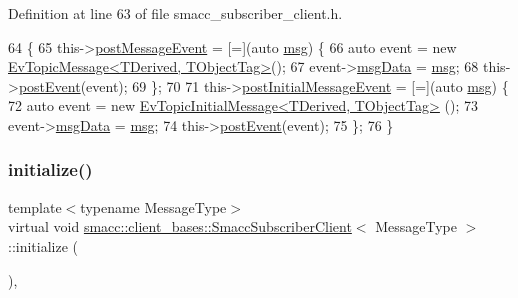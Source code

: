 Definition at line 63 of file smacc\+\_\+subscriber\+\_\+client.\+h.


\begin{DoxyCode}
64   \{
65     this->\hyperlink{classsmacc_1_1client__bases_1_1SmaccSubscriberClient_ad71ae0708e8a3ea321de985076d8b0ac}{postMessageEvent} = [=](\textcolor{keyword}{auto} \hyperlink{namespacebattery__monitor__node_ab1920c64448816edd4064e494275fdff}{msg}) \{
66       \textcolor{keyword}{auto} \textcolor{keyword}{event} = \textcolor{keyword}{new} \hyperlink{structsmacc_1_1default__events_1_1EvTopicMessage}{EvTopicMessage<TDerived, TObjectTag>}();
67       \textcolor{keyword}{event}->\hyperlink{structsmacc_1_1default__events_1_1EvTopicMessage_a82384568b702a0c3a3dc2fbe7eeefea9}{msgData} = \hyperlink{namespacebattery__monitor__node_ab1920c64448816edd4064e494275fdff}{msg};
68       this->\hyperlink{classsmacc_1_1ISmaccClient_a21a79203cb44fc717d4d977c190327c6}{postEvent}(event);
69     \};
70 
71     this->\hyperlink{classsmacc_1_1client__bases_1_1SmaccSubscriberClient_ac184f4c0a6e924ceb9eecc71d6252106}{postInitialMessageEvent} = [=](\textcolor{keyword}{auto} \hyperlink{namespacebattery__monitor__node_ab1920c64448816edd4064e494275fdff}{msg}) \{
72       \textcolor{keyword}{auto} \textcolor{keyword}{event} = \textcolor{keyword}{new} \hyperlink{structsmacc_1_1default__events_1_1EvTopicInitialMessage}{EvTopicInitialMessage<TDerived, TObjectTag>}
      ();
73       \textcolor{keyword}{event}->\hyperlink{structsmacc_1_1default__events_1_1EvTopicInitialMessage_a989c7cf4210c7750806b081bc73112cd}{msgData} = \hyperlink{namespacebattery__monitor__node_ab1920c64448816edd4064e494275fdff}{msg};
74       this->\hyperlink{classsmacc_1_1ISmaccClient_a21a79203cb44fc717d4d977c190327c6}{postEvent}(event);
75     \};
76   \}
\end{DoxyCode}
\mbox{\label{classsmacc_1_1client__bases_1_1SmaccSubscriberClient_af188f0f5e89de26a07e1f964cdd23a70}} 
\subsubsection{\texorpdfstring{initialize()}{initialize()}}
{\footnotesize\ttfamily template$<$typename Message\+Type$>$ \\
virtual void \hyperlink{classsmacc_1_1client__bases_1_1SmaccSubscriberClient}{smacc\+::client\+\_\+bases\+::\+Smacc\+Subscriber\+Client}$<$ Message\+Type $>$\+::initialize (\begin{DoxyParamCaption}{ }\end{DoxyParamCaption})\hspace{0.3cm}{\ttfamily [inline]}, {\ttfamily [virtual]}}



